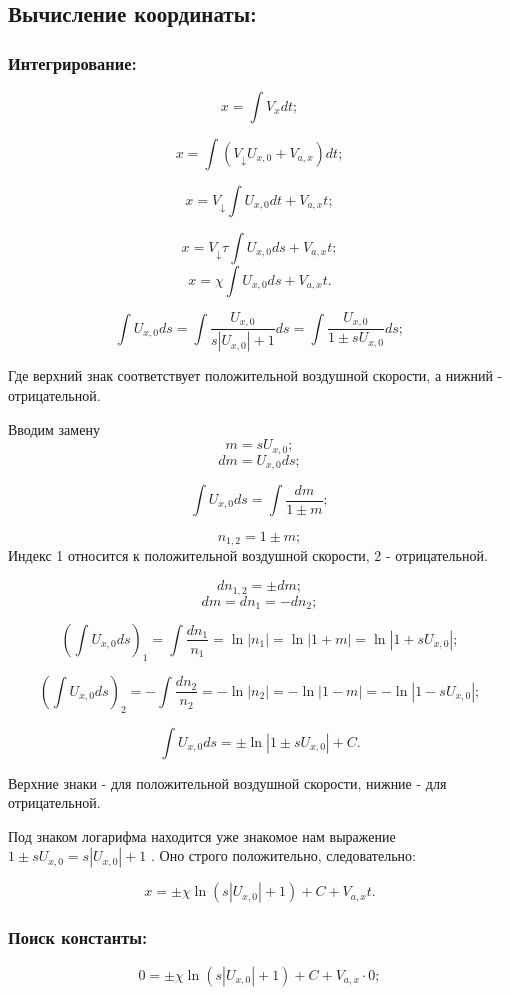 \subsection{Вычисление координаты:}

\subsubsection{Интегрирование:}

$$x = \int V_x dt;$$

$$x = \int\left (V_\downarrow U_{x,0} + V_{a,x} \right ) dt;$$

$$x = V_\downarrow \int U_{x,0} dt + V_{a,x}t;$$

$$x = V_\downarrow \tau \int U_{x,0} ds + V_{a,x}t;$$
$$x = \chi \int U_{x,0} ds + V_{a,x}t.$$

$$\int U_{x,0} ds = \int \frac{U_{x,0}}{s|U_{x,0}| + 1} ds = \int \frac{U_{x,0}}{1 \pm sU_{x,0}} ds;$$

Где верхний знак соответствует положительной воздушной скорости, а нижний - отрицательной.

Вводим замену
$$m = sU_{x,0};$$
$$dm = U_{x,0} ds;$$

$$\int U_{x,0} ds = \int \frac{dm}{1 \pm m};$$

$$n_{1,2} = 1 \pm m;$$
Индекс 1 относится к положительной воздушной скорости, 2 - отрицательной.

$$dn_{1,2} = \pm dm;$$
$$dm = dn_1 = -dn_2;$$

$$\left ( \int U_{x,0} ds \right ) _1 = \int \frac{dn_1}{n_1} = \ln |n_1| = \ln |1+m| = \ln |1+sU_{x,0}|;$$

$$\left ( \int U_{x,0} ds \right ) _2 = - \int \frac{dn_2}{n_2} = - \ln |n_2| = -\ln |1-m| =- \ln |1-sU_{x,0}|;$$

$$\int U_{x,0} ds = \pm \ln | 1\pm sU_{x,0} | + C.$$

Верхние знаки - для положительной воздушной скорости, нижние - для отрицательной.

Под знаком логарифма находится уже знакомое нам выражение $1 \pm sU_{x,0} = s|U_{x,0}| + 1$ . Оно строго положительно, следовательно:

$$x = \pm \chi \ln ( s|U_{x,0}| + 1 ) + C + V_{a,x}t.$$

\subsubsection{Поиск константы:}

$$0 = \pm \chi \ln{( s|U_{x,0}| + 1 )}+ C + V_{a,x} \cdot 0;$$

